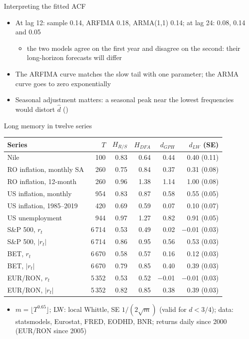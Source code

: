 \begin{frame}{Interpreting the fitted ACF}
\itemsize{\small}
\begin{itemize}
    \item At lag 12: sample 0.14, ARFIMA 0.18, ARMA(1,1) 0.14; at lag 24: 0.08, 0.14 and 0.05
    \begin{itemize}
        \item the two models agree on the first year and disagree on the second: their long-horizon forecasts will differ
    \end{itemize}
    \item The ARFIMA curve matches the slow tail with one parameter; the ARMA curve goes to zero exponentially
    \item Seasonal adjustment matters: a seasonal peak near the lowest frequencies would distort $\hat d$ ()
\end{itemize}
\end{frame}

\begin{frame}{Long memory in twelve series}
\itemsize{\footnotesize}
\begin{center}
\scriptsize
\begin{tabular}{lrrrrr}
\toprule
\textbf{Series} & $T$ & $H_{R/S}$ & $H_{DFA}$ & $d_{GPH}$ & $d_{LW}$ (SE) \\
\midrule
Nile & 100 & 0.83 & 0.64 & 0.44 & 0.40 (0.11) \\
RO inflation, monthly SA & 260 & 0.75 & 0.84 & 0.37 & 0.31 (0.08) \\
RO inflation, 12-month & 260 & 0.96 & 1.38 & 1.14 & 1.00 (0.08) \\
US inflation, monthly & 954 & 0.83 & 0.87 & 0.58 & 0.55 (0.05) \\
US inflation, 1985--2019 & 420 & 0.69 & 0.59 & 0.07 & 0.10 (0.07) \\
US unemployment & 944 & 0.97 & 1.27 & 0.82 & 0.91 (0.05) \\
S\&P 500, $r_t$ & 6\,714 & 0.53 & 0.49 & 0.02 & $-$0.01 (0.03) \\
S\&P 500, $|r_t|$ & 6\,714 & 0.86 & 0.95 & 0.56 & 0.53 (0.03) \\
BET, $r_t$ & 6\,670 & 0.58 & 0.57 & 0.16 & 0.12 (0.03) \\
BET, $|r_t|$ & 6\,670 & 0.79 & 0.85 & 0.40 & 0.39 (0.03) \\
EUR/RON, $r_t$ & 5\,352 & 0.53 & 0.52 & $-$0.01 & $-$0.01 (0.03) \\
EUR/RON, $|r_t|$ & 5\,352 & 0.82 & 0.85 & 0.38 & 0.39 (0.03) \\
\bottomrule
\end{tabular}
\end{center}
\begin{itemize}
    \item $m = \lfloor T^{0.65}\rfloor$; LW: local Whittle, SE $1/(2\sqrt m)$ (valid for $d < 3/4$); data: statsmodels, Eurostat, FRED, EODHD, BNR; returns daily since 2000 (EUR/RON since 2005)
\end{itemize}
\end{frame}

